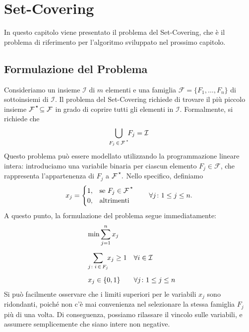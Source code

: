 \chapter{Set-Covering}

In questo capitolo viene presentato il problema del Set-Covering, che è il problema di riferimento per l'algoritmo
sviluppato nel prossimo capitolo.

\section{Formulazione del Problema}

Consideriamo un insieme \( \mathcal{I} \) di \( m \) elementi e una famiglia \( \mathcal{F} = \{F_1, \ldots, F_n\} \) di
sottoinsiemi di \( \mathcal{I} \). Il problema del Set-Covering richiede di trovare il più piccolo insieme
\(
    \mathcal{F}^{\,\text{\raisebox{2pt}{$\star$}}} \!\subseteq \mathcal{F}
\)
in grado di coprire tutti gli elementi in \( \mathcal{I} \). Formalmente, si richiede che
\begin{equation}
    \bigcup_{F_j \, \in \, \mathcal{F^{\,\text{\raisebox{2pt}{$\star$}}}}} \!\!F_j = \mathcal{I}
\end{equation}
Questo problema può essere modellato utilizzando la programmazione lineare intera: introduciamo una variabile binaria
per ciascun elemento \( F_j \in \mathcal{F} \), che rappresenta l'appartenenza di \( F_j \) a
\(
    \mathcal{F}^{\,\text{\raisebox{2pt}{$\star$}}}.
\)
Nello specifico, definiamo
\begin{equation}
    x_j =
    \begin{cases}
        1, & \text{se } F_j \in \mathcal{F}^{\,\text{\raisebox{2pt}{$\star$}}} \\
        0, & \text{altrimenti}
    \end{cases} \qquad \forall j\colon 1 \leq j \leq n.
\end{equation}
A questo punto, la formulazione del problema segue immediatamente:
\begin{equation}\label{eq:scp1}
    \begin{array}{ll}
        \hspace*{0.3cm}\min  \displaystyle\sum_{j=1}^{n} x_j \\[20pt]
        \hspace*{0.3cm}\displaystyle\sum_{j\colon i \,\in\, F_j} \!\! x_j \geq 1 & \forall i \in \mathcal{I} \\[20pt]
        \hspace*{0.3cm}x_j \in \{0, 1\} & \forall j\colon 1\leq j\leq n
    \end{array}
\end{equation}
Si può facilmente osservare che i limiti superiori per le variabili \( x_j \) sono ridondanti, poiché non c'è mai
convenienza nel selezionare la stessa famiglia \( F_j \) più di una volta. Di conseguenza, possiamo rilassare il vincolo
sulle variabili, e assumere semplicemente che siano intere non negative.

